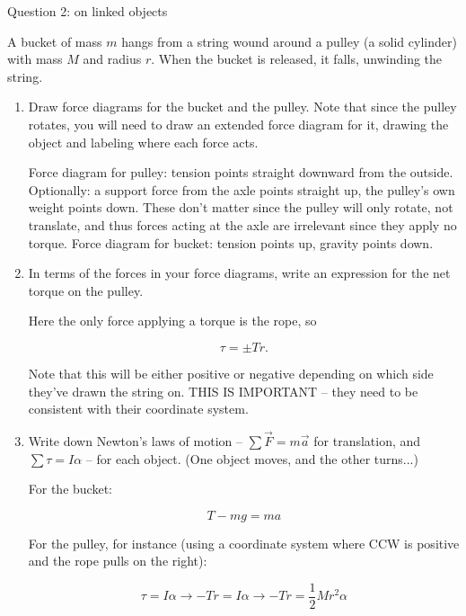 \documentclass[12pt]{article}
\begin{document}
	
	

\newpage
\centerline{\large Question 2: on linked objects}

A bucket of mass $m$ hangs from a string wound around a pulley
(a solid cylinder) with mass $M$ and radius $r$. When the bucket is
released, it falls, unwinding the string.

\begin{enumerate}

\item Draw force diagrams for the bucket and the pulley. Note that since the pulley rotates, you will need
to draw an extended force diagram for it, drawing the object and labeling where each force acts.


{\color{red}
Force diagram for pulley: tension points straight downward from the outside. Optionally: a support force from the axle points straight up, the pulley's own weight points down. These don't matter since the pulley will only rotate, not translate, and thus forces acting at the axle are irrelevant since they apply no torque. Force diagram for bucket: tension points up, gravity points down.}

\vspace{3in}

\item In terms of the forces in your force diagrams, write an expression for the net torque on the pulley.


{\color{red}
Here the only force applying a torque is the rope, so

$$\tau = \pm Tr.$$

Note that this will be either positive or negative depending on which side they've drawn the string on. THIS IS IMPORTANT -- they need to be consistent with their coordinate system.

}
\vspace{1in}

\item Write down Newton's laws of motion -- $\sum \vec F = m \vec a$ for translation, and $\sum \tau = I \alpha$
-- for each object. (One object moves, and the other turns...)


{\color{red}
For the bucket:

$$T - mg = ma$$

For the pulley, for instance (using a coordinate system where CCW is positive and the rope pulls on the right):

$$\tau = I \alpha \rightarrow -Tr = I \alpha \rightarrow -Tr = \frac{1}{2}Mr^2 \alpha$$


}
\end{enumerate}
\end{document}
